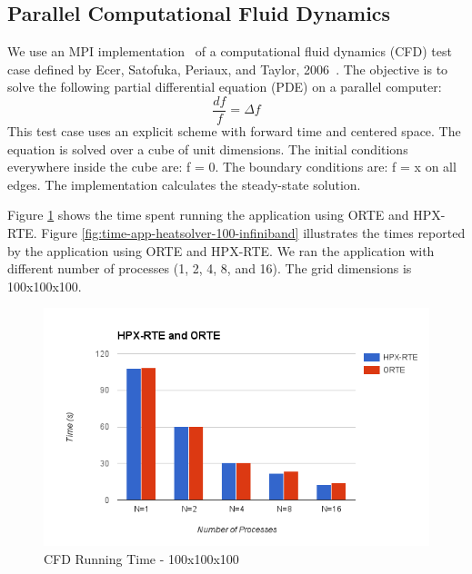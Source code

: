 \subsection{Parallel Computational Fluid Dynamics}
We use an MPI implementation~\cite{resch1999comparison} of a computational fluid dynamics (CFD) test case defined by Ecer, Satofuka, Periaux, and Taylor, 2006~\cite{ecer1996parallel}.
The objective is to solve the following partial differential equation (PDE) on a parallel computer:
\[
\frac{df}{f} = \Delta f
\]
This test case uses an explicit scheme with forward time and centered space. The equation is solved over a cube of unit dimensions. The initial conditions everywhere inside the cube are: f = 0. The boundary conditions are: f = x on all edges. The implementation calculates the steady-state solution.

Figure \ref{fig:time-all-heatsolver-100-infiniband} shows the time spent running the application using ORTE and HPX-RTE. Figure \ref{fig:time-app-heatsolver-100-infiniband} illustrates the times reported by the application using ORTE and HPX-RTE. We ran the application with different number of processes (1, 2, 4, 8, and 16). The grid dimensions is 100x100x100.

\begin{figure}[h!]
  \centering
  \includegraphics[scale=0.7]{images/time-all-heatsolver-100-infiniband.png}
  \caption[CFD Running Time - 100x100x100]{CFD Running Time - 100x100x100}
  \label{fig:time-all-heatsolver-100-infiniband}
\end{figure}

